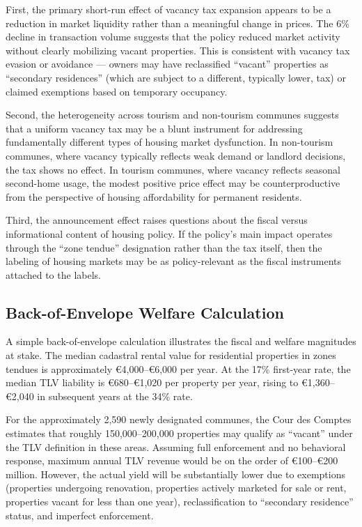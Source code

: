 \documentclass[12pt]{article}
\begin{document}
First, the primary short-run effect of vacancy tax expansion appears to be a reduction in market liquidity rather than a meaningful change in prices. The 6\% decline in transaction volume suggests that the policy reduced market activity without clearly mobilizing vacant properties. This is consistent with vacancy tax evasion or avoidance --- owners may have reclassified ``vacant'' properties as ``secondary residences'' (which are subject to a different, typically lower, tax) or claimed exemptions based on temporary occupancy.

Second, the heterogeneity across tourism and non-tourism communes suggests that a uniform vacancy tax may be a blunt instrument for addressing fundamentally different types of housing market dysfunction. In non-tourism communes, where vacancy typically reflects weak demand or landlord decisions, the tax shows no effect. In tourism communes, where vacancy reflects seasonal second-home usage, the modest positive price effect may be counterproductive from the perspective of housing affordability for permanent residents.

Third, the announcement effect raises questions about the fiscal versus informational content of housing policy. If the policy's main impact operates through the ``zone tendue'' designation rather than the tax itself, then the labeling of housing markets may be as policy-relevant as the fiscal instruments attached to the labels.

\subsection{Back-of-Envelope Welfare Calculation}

A simple back-of-envelope calculation illustrates the fiscal and welfare magnitudes at stake. The median cadastral rental value for residential properties in zones tendues is approximately \euro{4,000}--\euro{6,000} per year. At the 17\% first-year rate, the median TLV liability is \euro{680}--\euro{1,020} per property per year, rising to \euro{1,360}--\euro{2,040} in subsequent years at the 34\% rate.

For the approximately 2,590 newly designated communes, the Cour des Comptes estimates that roughly 150,000--200,000 properties may qualify as ``vacant'' under the TLV definition in these areas. Assuming full enforcement and no behavioral response, maximum annual TLV revenue would be on the order of \euro{100}--\euro{200} million. However, the actual yield will be substantially lower due to exemptions (properties undergoing renovation, properties actively marketed for sale or rent, properties vacant for less than one year), reclassification to ``secondary residence'' status, and imperfect enforcement.
\end{document}
